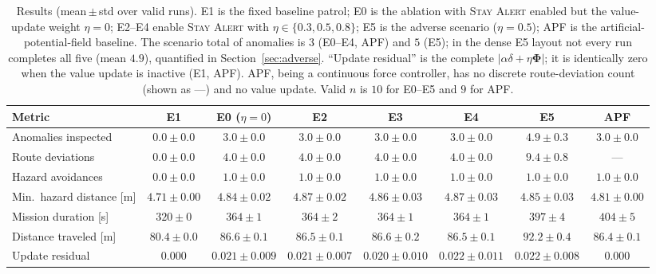 \begin{table}[t]
\centering
\caption{Results (mean\,$\pm$\,std over valid runs). E1 is the fixed baseline
patrol; E0 is the ablation with \textsc{Stay Alert} enabled but the value-update
weight $\eta=0$; E2--E4 enable \textsc{Stay Alert} with $\eta\in\{0.3,0.5,0.8\}$;
E5 is the adverse scenario ($\eta=0.5$); APF is the artificial-potential-field
baseline. The scenario total of anomalies is $3$ (E0--E4, APF) and $5$ (E5); in the
dense E5 layout not every run completes all five (mean $4.9$), quantified in
Section~\ref{sec:adverse}. ``Update residual'' is the complete
$|\alpha\delta+\eta\bm{\Phi}|$; it is identically zero when the value update is inactive
(E1, APF). APF, being a continuous force controller, has no discrete
route-deviation count (shown as ---) and no value update. Valid $n$ is $10$ for
E0--E5 and $9$ for APF.}
\label{tab:results}
\footnotesize
\setlength{\tabcolsep}{4pt}
\begin{tabular}{lccccccc}
\hline
\textbf{Metric} & \textbf{E1} & \textbf{E0 ($\eta{=}0$)} & \textbf{E2} & \textbf{E3} & \textbf{E4} & \textbf{E5} & \textbf{APF}\\
\hline
Anomalies inspected      & $0.0\pm0.0$ & $3.0\pm0.0$ & $3.0\pm0.0$ & $3.0\pm0.0$ & $3.0\pm0.0$ & $4.9\pm0.3$ & $3.0\pm0.0$\\
Route deviations         & $0.0\pm0.0$ & $4.0\pm0.0$ & $4.0\pm0.0$ & $4.0\pm0.0$ & $4.0\pm0.0$ & $9.4\pm0.8$ & ---\\
Hazard avoidances        & $0.0\pm0.0$ & $1.0\pm0.0$ & $1.0\pm0.0$ & $1.0\pm0.0$ & $1.0\pm0.0$ & $1.0\pm0.0$ & $1.0\pm0.0$\\
Min.\ hazard distance [m]& $4.71\pm0.00$ & $4.84\pm0.02$ & $4.87\pm0.02$ & $4.86\pm0.03$ & $4.87\pm0.03$ & $4.85\pm0.03$ & $4.81\pm0.00$\\
Mission duration [s]     & $320\pm0$ & $364\pm1$ & $364\pm2$ & $364\pm1$ & $364\pm1$ & $397\pm4$ & $404\pm5$\\
Distance traveled [m]   & $80.4\pm0.0$ & $86.6\pm0.1$ & $86.5\pm0.1$ & $86.6\pm0.2$ & $86.5\pm0.1$ & $92.2\pm0.4$ & $86.4\pm0.1$\\
Update residual          & $0.000$ & $0.021\pm0.009$ & $0.021\pm0.007$ & $0.020\pm0.010$ & $0.022\pm0.011$ & $0.022\pm0.008$ & $0.000$\\
\hline
\end{tabular}
\end{table}

